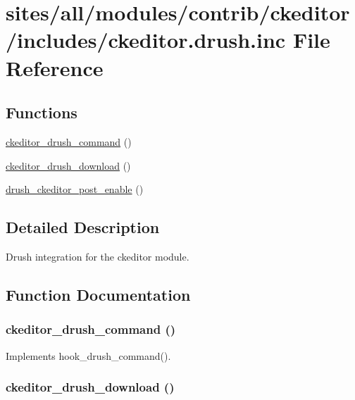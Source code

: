 \hypertarget{ckeditor_8drush_8inc}{
\section{sites/all/modules/contrib/ckeditor/includes/ckeditor.drush.inc File Reference}
\label{ckeditor_8drush_8inc}
}
\subsection*{Functions}
\begin{CompactItemize}
\item 
\hyperlink{ckeditor_8drush_8inc_f876bf69c1fbaae14cec52dd6da69cb7}{ckeditor\_\-drush\_\-command} ()
\item 
\hyperlink{ckeditor_8drush_8inc_966f979568a5d80ffcc3fa4ce8f94915}{ckeditor\_\-drush\_\-download} ()
\item 
\hyperlink{ckeditor_8drush_8inc_4ff812b91c4557cb3c2c45568d6877cd}{drush\_\-ckeditor\_\-post\_\-enable} ()
\end{CompactItemize}


\subsection{Detailed Description}
Drush integration for the ckeditor module. 

\subsection{Function Documentation}
\hypertarget{ckeditor_8drush_8inc_f876bf69c1fbaae14cec52dd6da69cb7}{
\subsubsection[{ckeditor\_\-drush\_\-command}]{\setlength{\rightskip}{0pt plus 5cm}ckeditor\_\-drush\_\-command ()}}
\label{ckeditor_8drush_8inc_f876bf69c1fbaae14cec52dd6da69cb7}


Implements hook\_\-drush\_\-command(). \hypertarget{ckeditor_8drush_8inc_966f979568a5d80ffcc3fa4ce8f94915}{
\subsubsection[{ckeditor\_\-drush\_\-download}]{\setlength{\rightskip}{0pt plus 5cm}ckeditor\_\-drush\_\-download ()}}
\label{ckeditor_8drush_8inc_966f979568a5d80ffcc3fa4ce8f94915}


